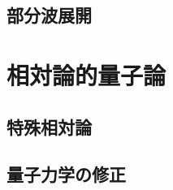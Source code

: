 \documentclass{report}
\begin{document}
    \section{部分波展開}
      
  \chapter{相対論的量子論}
    \section{特殊相対論}
      
    \section{量子力学の修正}
      
\end{document}
